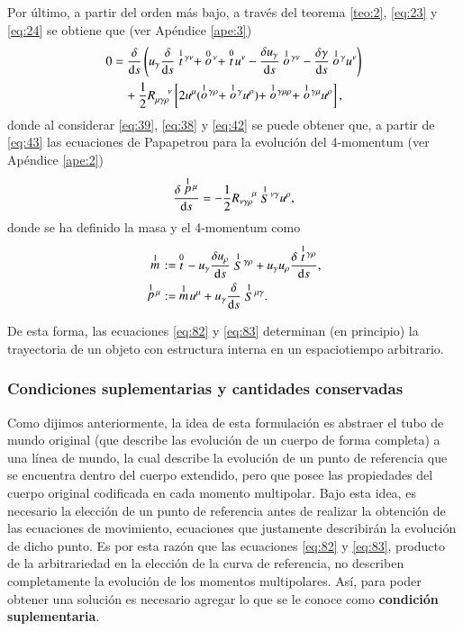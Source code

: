 Por último, a partir del orden más bajo, a través del teorema \ref{teo:2}, \eqref{eq:23} y \eqref{eq:24} se obtiene que (ver Apéndice \ref{ape:3})
\begin{align}
\label{eq:43}
0 &= \cd{} \left( u_{\gamma} \cd{} \des{1}{t}^{\gamma \nu} + \des{0}{o}^{\nu} + \des{0}{t} u^{\nu} - \cd{u_{\gamma}} \des{1}{o}^{\gamma \nu} - \cd{\gamma} \des{1}{o}^{\gamma}u^{\nu} \right) \nonumber \\
& \quad + \frac{1}{2} R^{\ \ \ \ \nu}_{\mu \gamma \rho} \left[ 2u^{\mu}(\des{1}{o}^{\gamma \rho} + \des{1}{o}^{\gamma} u^{\rho}) + \des{1}{o}^{\gamma \mu \rho} + \des{1}{o}^{\gamma \mu}  u^{\rho}  \right],
\end{align}
donde al considerar \eqref{eq:39}, \eqref{eq:38} y \eqref{eq:42} se puede obtener que, a partir de \eqref{eq:43} las ecuaciones de Papapetrou para la evolución del 4-momentum (ver Apéndice \ref{ape:2})
\begin{equation}
\label{eq:82}
\frac{\delta \stackrel{1}{p}{\!}^{\mu}}{\mathrm{d}s} = -\frac{1}{2} R^{\ \ \ \ \mu}_{\nu \gamma \rho} \stackrel{1}{S}{\!}^{\nu \gamma} u^{\rho},
\end{equation}
donde se ha definido la masa y el 4-momentum como
\begin{align}
\stackrel{1}{m}{\!} &:=\ \stackrel{0}{t}{\!} - u_{\gamma} \frac{\delta u_{\rho}}{\mathrm{d}s} \stackrel{1}{S}{\!}^{\gamma \rho} + u_{\gamma} u_{\rho} \frac{\delta \stackrel{1}{t}{\!}^{\gamma \rho}}{\mathrm{d}s},\\
\label{eq:44}
\stackrel{1}{p}{\!}^{\mu} &:=\ \stackrel{1}{m}{\!} u^{\mu} + u_{\gamma} \frac{\delta }{\mathrm{d}s} \stackrel{1}{S}{\!}^{\mu \gamma}.
\end{align}

De esta forma, las ecuaciones \eqref{eq:82} y \eqref{eq:83} determinan (en principio) la trayectoria de un objeto con estructura interna en un espaciotiempo arbitrario.

\subsubsection{Condiciones suplementarias y cantidades conservadas}

Como dijimos anteriormente, la idea de esta formulación es abstraer el tubo de mundo original (que describe las evolución de un cuerpo de forma completa) a una línea de mundo, la cual describe la evolución de un punto de referencia que se encuentra dentro del cuerpo extendido, pero que posee las propiedades del cuerpo original codificada en cada momento multipolar. Bajo esta idea, es necesario la elección de un punto de referencia antes de realizar la obtención de las ecuaciones de movimiento, ecuaciones que justamente describirán la evolución de dicho punto. Es por esta razón que las ecuaciones \eqref{eq:82} y \eqref{eq:83}, producto de la arbitrariedad en la elección de la curva de referencia, no describen completamente la evolución de los momentos multipolares. Así, para poder obtener una solución es necesario agregar lo que se le conoce como \textbf{condición suplementaria}.

